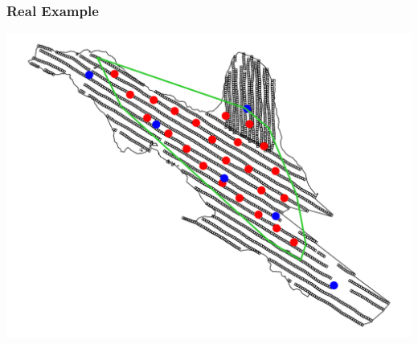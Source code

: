 \documentclass[mathserif,compress]{beamer}\usepackage{graphicx, color}
\makeatletter
\def\maxwidth{ %
  \ifdim\Gin@nat@width>\linewidth
    \linewidth
  \else
    \Gin@nat@width
  \fi
}
\makeatother
\begin{document}
\subsection{}
\begin{frame}[fragile]
\frametitle{Real Example}







	\vspace{-.4cm}
	\begin{center}
		\includegraphics[width = .9\maxwidth]{figure/icyBayKnots-plot}
	\end{center}


\end{frame}

\end{document}
